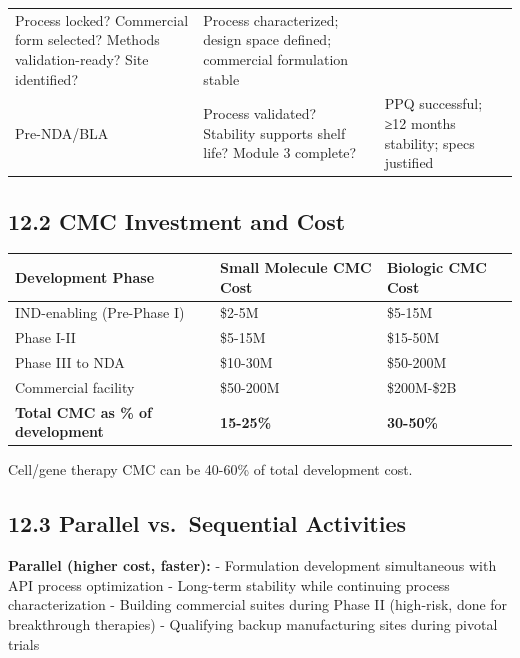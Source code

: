 \documentclass[
  11pt,
  a4paper,
]{report}
\begin{document}
\begin{longtable}[]{@{}lll@{}}
\begin{minipage}[t]{0.38\columnwidth}
Process locked? Commercial form selected? Methods validation-ready? Site
identified?\strut
\end{minipage} & \begin{minipage}[t]{0.40\columnwidth}\raggedright
Process characterized; design space defined; commercial formulation
stable\strut
\end{minipage}\tabularnewline
\begin{minipage}[t]{0.13\columnwidth}\raggedright
Pre-NDA/BLA\strut
\end{minipage} & \begin{minipage}[t]{0.38\columnwidth}\raggedright
Process validated? Stability supports shelf life? Module 3
complete?\strut
\end{minipage} & \begin{minipage}[t]{0.40\columnwidth}\raggedright
PPQ successful; ≥12 months stability; specs justified\strut
\end{minipage}\tabularnewline
\bottomrule
\end{longtable}

\hypertarget{cmc-investment-and-cost}{%
\subsection{12.2 CMC Investment and
Cost}\label{cmc-investment-and-cost}}

\begin{longtable}[]{@{}lll@{}}
\toprule
Development Phase & Small Molecule CMC Cost & Biologic CMC
Cost\tabularnewline
\midrule
\endhead
IND-enabling (Pre-Phase I) & \$2-5M & \$5-15M\tabularnewline
Phase I-II & \$5-15M & \$15-50M\tabularnewline
Phase III to NDA & \$10-30M & \$50-200M\tabularnewline
Commercial facility & \$50-200M & \$200M-\$2B\tabularnewline
\textbf{Total CMC as \% of development} & \textbf{15-25\%} &
\textbf{30-50\%}\tabularnewline
\bottomrule
\end{longtable}

Cell/gene therapy CMC can be 40-60\% of total development cost.

\hypertarget{parallel-vs.-sequential-activities}{%
\subsection{12.3 Parallel vs.~Sequential
Activities}\label{parallel-vs.-sequential-activities}}

\textbf{Parallel (higher cost, faster):} - Formulation development
simultaneous with API process optimization - Long-term stability while
continuing process characterization - Building commercial suites during
Phase II (high-risk, done for breakthrough therapies) - Qualifying
backup manufacturing sites during pivotal trials
\end{document}
